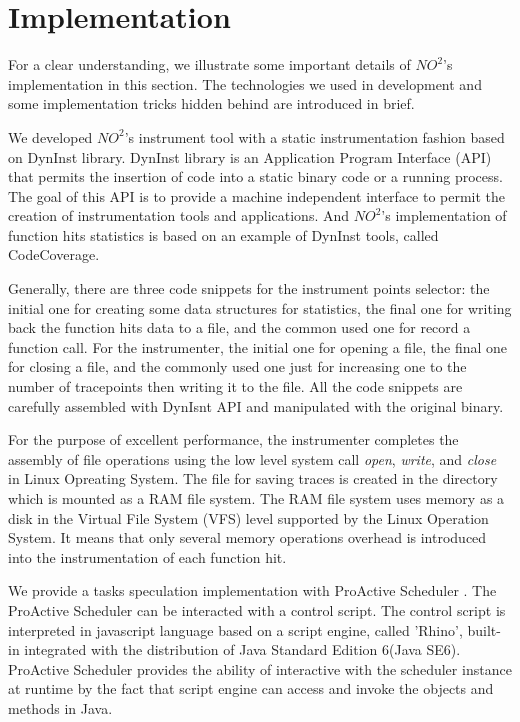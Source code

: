 \section{Implementation}

For a clear understanding, we illustrate some important details of $NO^2$'s implementation
in this section. The technologies we used in development and some implementation tricks
hidden behind are introduced in brief.

We developed $NO^2$'s instrument tool with a static instrumentation fashion based on
DynInst \cite{Dyninst-Deconstruction} library. DynInst library is an Application Program
Interface (API) \cite{dyninstapi} that permits the insertion of code into a static binary
code or a running process. The goal of this API is to provide a machine independent
interface to permit the creation of instrumentation tools and applications. And $NO^2$'s
implementation of function hits statistics is based on an example of DynInst tools, called
CodeCoverage.

Generally, there are three code snippets for the instrument points selector: the initial
one for creating some data structures for statistics, the final one for writing back the
function hits data to a file, and the common used one for record a function call. For the
instrumenter, the initial one for opening a file, the final one for closing a file, and
the commonly used one just for increasing one to the number of tracepoints then writing it
to the file. All the code snippets are carefully assembled with DynIsnt API and
manipulated with the original binary.

For the purpose of excellent performance, the instrumenter completes the assembly of file
operations using the low level system call \emph{open}, \emph{write}, and \emph{close} in
Linux Opreating System. The file for saving traces is created in the directory which is
mounted as a RAM file system. The RAM file system uses memory as a disk in the Virtual
File System (VFS) level supported by the Linux Operation System. It means that only
several memory operations overhead is introduced into the instrumentation of each function
hit.

We provide a tasks speculation implementation with ProActive Scheduler
\cite{pascheduling}. The ProActive Scheduler can be interacted with a control script. The
control script is interpreted in javascript language based on a script engine, called
'Rhino', built-in integrated with the distribution of Java Standard Edition 6(Java SE6).
ProActive Scheduler provides the ability of interactive with the scheduler instance at
runtime by the fact that script engine can access and invoke the objects and methods in
Java.


